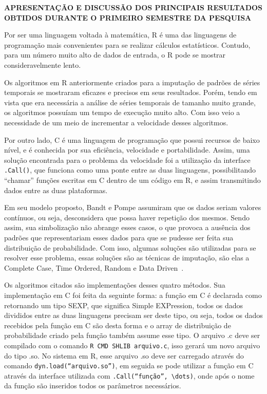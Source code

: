 \documentclass{article}
\begin{document}
\newpage
\begin{center}
\textbf{\large{APRESENTAÇÃO E DISCUSSÃO DOS PRINCIPAIS RESULTADOS OBTIDOS DURANTE O PRIMEIRO SEMESTRE DA PESQUISA}}

\hrulefill 

\end{center}
    
Por ser uma linguagem voltada à matemática, R é uma das linguagens de programação mais convenientes para se realizar cálculos estatísticos. Contudo, para um número muito alto de dados de entrada, o R pode se mostrar consideravelmente lento.


Os algoritmos em R anteriormente criados para a imputação de padrões de séries temporais se mostraram eficazes e precisos em seus resultados. Porém, tendo em vista que era necessária a análise de séries temporais de tamanho muito grande, os algoritmos possuíam um tempo de execução muito alto. Com isso veio a necessidade de um meio de incrementar a velocidade desses algoritmos.

Por outro lado, C é uma linguagem de programação que possui recursos de baixo nível, e é conhecida por sua eficiência, velocidade e portabilidade. Assim, uma solução encontrada para o problema da velocidade foi a utilização da interface \verb|.Call()|, que funciona como uma ponte entre as duas linguagens, possibilitando “chamar” funções escritas em C dentro de um código em R, e assim transmitindo dados entre as duas plataformas.

Em seu modelo proposto, Bandt e Pompe assumiram que os dados seriam valores contínuos, ou seja, desconsidera que possa haver repetição dos mesmos. Sendo assim, sua simbolização não abrange esses casos, o que provoca a ausência dos padrões que representariam esses dados para que se pudesse ser feita sua distribuição de probabilidade. Com isso, algumas soluções são utilizadas para se resolver esse problema, essas soluções são as técnicas de imputação, são elas a Complete Case, Time Ordered, Random e Data Driven~\cite{traversaro2018bandt}.

Os algoritmos citados são implementações desses quatro métodos. Sua implementação em C foi feita da seguinte forma: a função em C é declarada como retornando um tipo SEXP, que significa Simple EXPression, todos os dados divididos entre as duas linguagens precisam ser deste tipo, ou seja, todos os dados recebidos pela função em C são desta forma e o array de distribuição de probabilidade criado pela função também assume esse tipo. O arquivo .c deve ser compilado com o comando \verb|R CMD SHLIB arquivo.c|, isso gerará um novo arquivo do tipo .so. No sistema em R, esse arquivo .so deve ser carregado através do comando \verb|dyn.load(“arquivo.so”)|, em seguida se pode utilizar a função em C através da interface utilizada com \verb|.Call(“função”, \dots)|, onde após o nome da função são inseridos todos os parâmetros necessários\cite{.Call}\cite{Extensions}.
\end{document}
